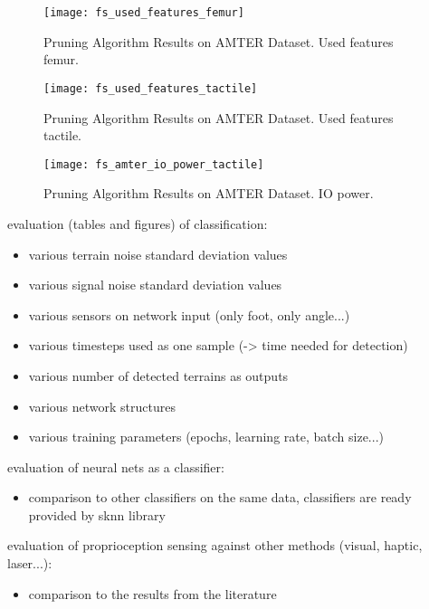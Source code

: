 \begin{figure}[H]
  \centering
  \texttt{[image: fs\_used\_features\_femur]}
  \caption{Pruning Algorithm Results on AMTER Dataset. Used features femur.}
  \label{fig:pa_amter_used_features_femur}
\end{figure}

\begin{figure}[H]
  \centering
  \texttt{[image: fs\_used\_features\_tactile]}
  \caption{Pruning Algorithm Results on AMTER Dataset. Used features tactile.}
  \label{fig:pa_amter_used_features_tactile}
\end{figure}

\begin{figure}[H]
  \centering
  \texttt{[image: fs\_amter\_io\_power\_tactile]}
  \caption{Pruning Algorithm Results on AMTER Dataset. IO power.}
  \label{fig:pa_amter_io_power_tactile}
\end{figure}



evaluation (tables and figures) of classification:
\begin{itemize}
\item various terrain noise standard deviation values
\item various signal noise standard deviation values
\item various sensors on network input (only foot, only angle...)
\item various timesteps used as one sample (-> time needed for detection)
\item various number of detected terrains as outputs
\item various network structures
\item various training parameters (epochs, learning rate, batch size...)
\end{itemize}


evaluation of neural nets as a classifier:
\begin{itemize}
\item comparison to other classifiers on the same data, classifiers are ready provided by sknn library
\end{itemize}

evaluation of proprioception sensing against other methods (visual, haptic, laser...):
\begin{itemize}
\item comparison to the results from the literature
\end{itemize}

